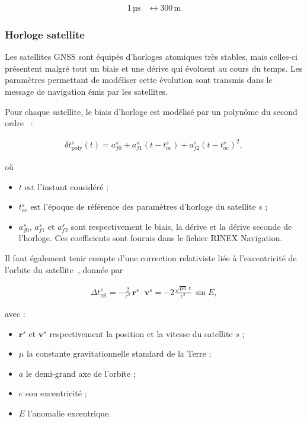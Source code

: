\begin{align}
1\,\text{µs} &\leftrightarrow 300\,\text{m}
\end{align}
\subsubsection{Horloge satellite}

Les satellites GNSS sont équipés d'horloges atomiques très stables, mais celles-ci présentent malgré tout un biais et une dérive qui évoluent au cours du temps. Les paramètres permettant de modéliser cette évolution sont transmis dans le message de navigation émis par les satellites.

Pour chaque satellite, le biais d'horloge est modélisé par un polynôme du second ordre~\cite{isgps200n} :

\begin{align}
\delta t_{\mathrm{poly}}^s(t)
=
a_{f0}^s
+
a_{f1}^s(t-t_{oc}^s)
+
a_{f2}^s(t-t_{oc}^s)^2,
\end{align}

où

\begin{itemize}
    \item $t$ est l'instant considéré ;
    \item $t_{oc}^s$ est l'époque de référence des paramètres d'horloge du
    satellite $s$ ;
    \item $a_{f0}^s$, $a_{f1}^s$ et $a_{f2}^s$ sont respectivement le biais,
    la dérive et la dérive seconde de l'horloge. Ces coefficients sont fournis
    dans le fichier RINEX Navigation.
\end{itemize}

Il faut également tenir compte d'une correction relativiste liée à l'excentricité de l'orbite du satellite~\cite{ashby2003}, donnée par

\begin{align}
\Delta t_{\mathrm{rel}}^s
=
-\frac{2}{c^2}\,
\mathbf r^s \cdot \mathbf v^s
=
-2\frac{\sqrt{\mu a}\,e}{c^2}\,\sin E,
\end{align}

avec :
\begin{itemize}
    \item $\mathbf r^s$ et $\mathbf v^s$ respectivement la position et la
    vitesse du satellite $s$ ;
    \item $\mu$  la constante gravitationnelle standard de la Terre ;
    \item $a$ le demi-grand axe de l'orbite ;
    \item $e$ son excentricité ;
    \item $E$ l'anomalie excentrique.
\end{itemize}


